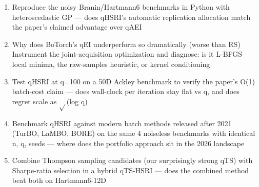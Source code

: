\documentclass[11pt]{article}
\begin{document}
\begin{enumerate}[leftmargin=1.6em,itemsep=0.2em,topsep=0.2em,label=Q\arabic*.]
\item Reproduce the noisy Branin/Hartmann6 benchmarks in Python with heteroscedastic GP --- does qHSRI's automatic replication allocation match the paper's claimed advantage over qAEI
\item Why does BoTorch's qEI underperform so dramatically (worse than RS) Instrument the joint-acquisition optimization and diagnose: is it L-BFGS local minima, the raw-samples heuristic, or kernel conditioning
\item Test qHSRI at q=100 on a 50D Ackley benchmark to verify the paper's O(1) batch-cost claim --- does wall-clock per iteration stay flat vs q, and does regret scale as $\sqrt{}$(log q)
\item Benchmark qHSRI against modern batch methods released after 2021 (TurBO, LaMBO, BORE) on the same 4 noiseless benchmarks with identical n, q, seeds --- where does the portfolio approach sit in the 2026 landscape
\item Combine Thompson sampling candidates (our surprisingly strong qTS) with Sharpe-ratio selection in a hybrid qTS-HSRI --- does the combined method beat both on Hartmann6-12D
\end{enumerate}
\end{document}
